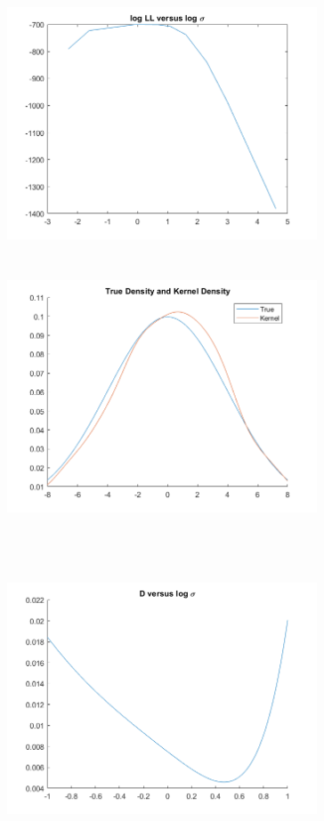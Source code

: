 \documentclass{article}
\begin{document}
\begin{figure}[H]
    \begin{floatrow}
    {\includegraphics[width =9.2cm, height=8cm]{logll.png}}
    {\includegraphics[width =9.2cm, height=8cm]{kernel1.png}}
    \end{floatrow}
    \begin{floatrow}
    {\includegraphics[width =9.2cm, height=9cm]{Dlog.png}}

\end{floatrow}
\end{figure}
\end{document}
